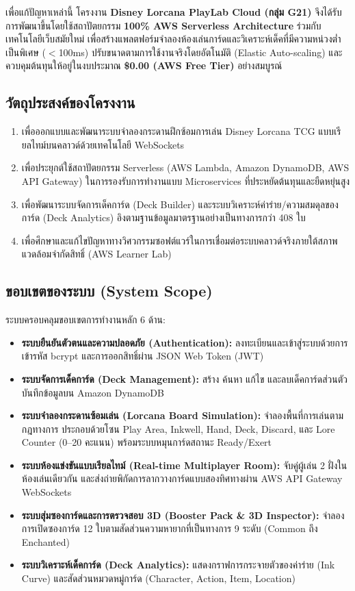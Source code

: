 \documentclass[12pt,a4paper]{article}
\begin{document}
เพื่อแก้ปัญหาเหล่านี้ โครงงาน \textbf{Disney Lorcana PlayLab Cloud (กลุ่ม G21)} จึงได้รับการพัฒนาขึ้นโดยใช้สถาปัตยกรรม \textbf{100\% AWS Serverless Architecture} ร่วมกับเทคโนโลยีเว็บสมัยใหม่ เพื่อสร้างแพลตฟอร์มจำลองห้องเล่นการ์ดและวิเคราะห์เด็คที่มีความหน่วงต่ำเป็นพิเศษ ($<$100ms) ปรับขนาดตามการใช้งานจริงโดยอัตโนมัติ (Elastic Auto-scaling) และควบคุมต้นทุนให้อยู่ในงบประมาณ \textbf{\$0.00 (AWS Free Tier)} อย่างสมบูรณ์

\subsection{วัตถุประสงค์ของโครงงาน}
\begin{enumerate}[leftmargin=1.5em, itemsep=2pt]
  \item เพื่อออกแบบและพัฒนาระบบจำลองกระดานฝึกซ้อมการเล่น Disney Lorcana TCG แบบเรียลไทม์บนคลาวด์ด้วยเทคโนโลยี WebSockets
  \item เพื่อประยุกต์ใช้สถาปัตยกรรม Serverless (AWS Lambda, Amazon DynamoDB, AWS API Gateway) ในการรองรับการทำงานแบบ Microservices ที่ประหยัดต้นทุนและยืดหยุ่นสูง
  \item เพื่อพัฒนาระบบจัดการเด็คการ์ด (Deck Builder) และระบบวิเคราะห์ค่าร่าย/ความสมดุลของการ์ด (Deck Analytics) อิงตามฐานข้อมูลมาตรฐานอย่างเป็นทางการกว่า 408 ใบ
  \item เพื่อศึกษาและแก้ไขปัญหาทางวิศวกรรมซอฟต์แวร์ในการเชื่อมต่อระบบคลาวด์จริงภายใต้สภาพแวดล้อมจำกัดสิทธิ์ (AWS Learner Lab)
\end{enumerate}

\subsection{ขอบเขตของระบบ (System Scope)}
ระบบครอบคลุมขอบเขตการทำงานหลัก 6 ด้าน:
\begin{itemize}[leftmargin=1.5em, itemsep=2pt]
  \item \textbf{ระบบยืนยันตัวตนและความปลอดภัย (Authentication):} ลงทะเบียนและเข้าสู่ระบบด้วยการเข้ารหัส bcrypt และการออกสิทธิ์ผ่าน JSON Web Token (JWT)
  \item \textbf{ระบบจัดการเด็คการ์ด (Deck Management):} สร้าง ค้นหา แก้ไข และลบเด็คการ์ดส่วนตัว บันทึกข้อมูลบน Amazon DynamoDB
  \item \textbf{ระบบจำลองกระดานซ้อมเล่น (Lorcana Board Simulation):} จำลองพื้นที่การเล่นตามกฎทางการ ประกอบด้วยโซน Play Area, Inkwell, Hand, Deck, Discard, และ Lore Counter (0--20 คะแนน) พร้อมระบบหมุนการ์ดสถานะ Ready/Exert
  \item \textbf{ระบบห้องแข่งขันแบบเรียลไทม์ (Real-time Multiplayer Room):} จับคู่ผู้เล่น 2 ฝั่งในห้องเล่นเดียวกัน และส่งถ่ายพิกัดการลากวางการ์ดแบบสองทิศทางผ่าน AWS API Gateway WebSockets
  \item \textbf{ระบบสุ่มซองการ์ดและการตรวจสอบ 3D (Booster Pack \& 3D Inspector):} จำลองการเปิดซองการ์ด 12 ใบตามสัดส่วนความหายากที่เป็นทางการ 9 ระดับ (Common ถึง Enchanted)
  \item \textbf{ระบบวิเคราะห์เด็คการ์ด (Deck Analytics):} แสดงกราฟการกระจายตัวของค่าร่าย (Ink Curve) และสัดส่วนหมวดหมู่การ์ด (Character, Action, Item, Location)
\end{itemize}
\end{document}
